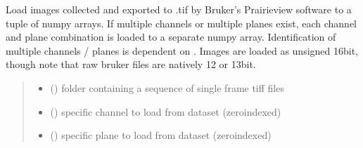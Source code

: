 \documentclass[letterpaper,10pt,english]{sphinxmanual}
\begin{document}

\begin{fulllineitems}
\label{\detokenize{CalSciPy.bruker:CalSciPy.bruker.load_bruker_tifs}}
\pysigstartsignatures
{}
\pysigstopsignatures
\sphinxAtStartPar
Load images collected and exported to .tif by Bruker’s Prairieview software to a tuple of numpy arrays.
If multiple channels or multiple planes exist, each channel and plane combination is loaded to a separate
numpy array. Identification of multiple channels / planes is dependent on {\hyperref[\detokenize{CalSciPy.bruker:CalSciPy.bruker.determine_imaging_content}]{}}.
Images are loaded as unsigned 16\sphinxhyphen{}bit, though note that raw bruker files are natively 12 or 13\sphinxhyphen{}bit.
\begin{quote}\begin{description}
\begin{itemize}
\item {} 
\sphinxAtStartPar
{} () \textendash{} folder containing a sequence of single frame tiff files

\item {} 
\sphinxAtStartPar
{} (\sphinxstyleliteralemphasis{\sphinxupquote{{[}}}\sphinxstyleliteralemphasis{\sphinxupquote{{]} }}) \textendash{} specific channel to load from dataset (zero\sphinxhyphen{}indexed)

\item {} 
\sphinxAtStartPar
{} (\sphinxstyleliteralemphasis{\sphinxupquote{{[}}}\sphinxstyleliteralemphasis{\sphinxupquote{{]} }}) \textendash{} specific plane to load from dataset (zero\sphinxhyphen{}indexed)


\end{itemize}
\end{description}
\end{quote}
\end{fulllineitems}
\end{document}
